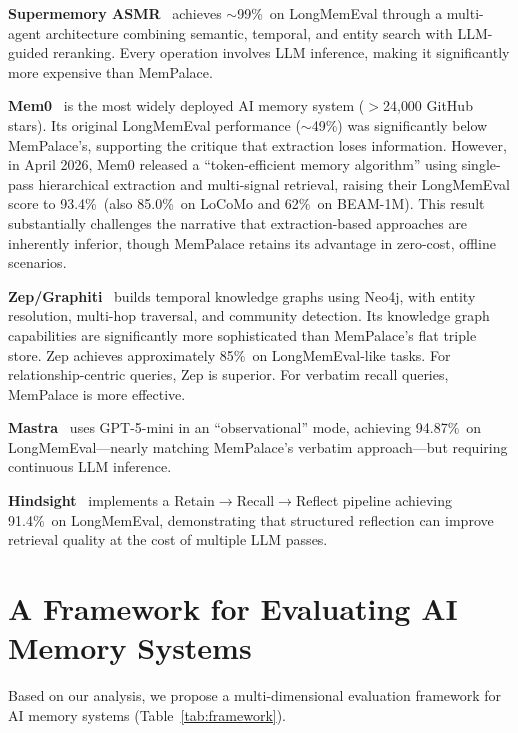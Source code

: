 \documentclass[twoside,11pt]{article}
\begin{document}
\textbf{Supermemory ASMR}~\citep{supermemory} achieves $\sim$99\%\ on
LongMemEval through a multi-agent architecture combining semantic, temporal,
and entity search with LLM-guided reranking.  Every operation involves LLM
inference, making it significantly more expensive than MemPalace.

\textbf{Mem0}~\citep{mem0} is the most widely deployed AI memory system
($>$24{,}000 GitHub stars).  Its original LongMemEval performance
($\sim$49\%) was significantly below MemPalace's, supporting the critique that
extraction loses information.  However, in April 2026, Mem0 released a
``token-efficient memory algorithm'' using single-pass hierarchical extraction
and multi-signal retrieval, raising their LongMemEval score to 93.4\%\ (also
85.0\%\ on LoCoMo and 62\%\ on BEAM-1M).  This result substantially
challenges the narrative that extraction-based approaches are inherently
inferior, though MemPalace retains its advantage in zero-cost, offline
scenarios.

\textbf{Zep/Graphiti}~\citep{zep} builds temporal knowledge graphs using
Neo4j, with entity resolution, multi-hop traversal, and community detection.
Its knowledge graph capabilities are significantly more sophisticated than
MemPalace's flat triple store.  Zep achieves approximately 85\%\ on
LongMemEval-like tasks.  For relationship-centric queries, Zep is superior.
For verbatim recall queries, MemPalace is more effective.

\textbf{Mastra}~\citep{mastra} uses GPT-5-mini in an ``observational'' mode,
achieving 94.87\%\ on LongMemEval---nearly matching MemPalace's verbatim
approach---but requiring continuous LLM inference.

\textbf{Hindsight}~\citep{hindsight} implements a Retain$\to$Recall$\to$Reflect
pipeline achieving 91.4\%\ on LongMemEval, demonstrating that structured
reflection can improve retrieval quality at the cost of multiple LLM passes.

\section{A Framework for Evaluating AI Memory Systems}
\label{sec:framework}

Based on our analysis, we propose a multi-dimensional evaluation framework
for AI memory systems (Table~\ref{tab:framework}).
\end{document}
